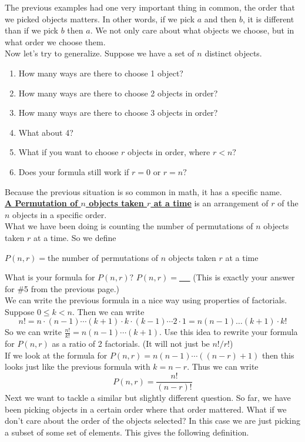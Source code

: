 \documentclass[14,fleqn]{article}
\newcommand{\defn}[1]{\textbf{\underline{#1}}}
\begin{document}
The previous examples had one very important thing in common, the order that we picked objects matters. In other words, if we pick $a$ and then $b$, it is different than if we pick $b$ then $a.$ We not only care about what objects we choose, but in what order we choose them.\\
Now let's try to generalize. Suppose we have a set of $n$ distinct objects.
\begin{enumerate}
	\item How many ways are there to choose 1 object?
	\item How many ways are there to choose 2 objects in order? 
	\item How many ways are there to choose 3 objects in order?
	\item What about 4?
	\item What if you want to choose $r$ objects in order, where $r<n?$
	\item Does your formula still work if $r=0$ or $r=n?$
\end{enumerate}
\pagebreak
Because the previous situation is so common in math, it has a specific name.\\
\defn{A Permutation of $n$ objects taken $r$ at a time} is an arrangement of $r$ of the $n$ objects in a specific order.\\

What we have been doing is counting the number of permutations of $n$ objects taken $r$ at a time. So we define
\begin{center}
	$P(n,r)=$the number of permutations of $n$ objects taken $r$ at a time
\end{center}
What is your formula for $P(n,r)?$ $P(n,r)=$\underline{\ \hspace*{2 in} \ } (This is exactly your answer for \#5 from the previous page.)\\
We can write the previous formula in a nice way using properties of factorials. Suppose $0\le k<n.$ Then we can write
\[
	n!=n\cdot (n-1)\cdots (k+1)\cdot k\cdot (k-1)\cdots 2\cdot 1=n(n-1)\dots(k+1)\cdot k!
\]
So we can write $\displaystyle \frac{n!}{k!}=n(n-1)\cdots(k+1).$
Use this idea to rewrite your formula for $P(n,r)$ as a ratio of 2 factorials. (It will not just be $n!/r!$)\\[.2 in]


	If we look at the formula for $P(n,r)=n(n-1)\cdots ((n-r)+1)$ then this looks just like the previous formula with $k=n-r.$ Thus we can write
	\[
		P(n,r)=\frac{n!}{(n-r)!}
	\]
Next we want to tackle a similar but slightly different question. So far, we have been picking objects in a certain order where that order mattered. What if we don't care about the order of the objects selected? In this case we are just picking a subset of some set of elements. This gives the following definition.
\end{document}

